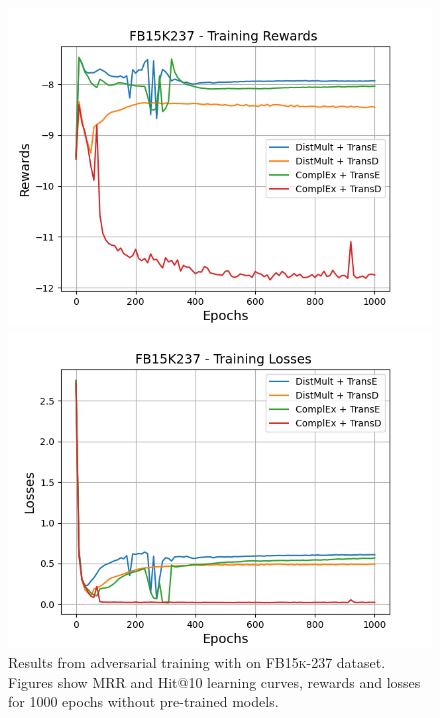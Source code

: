 \begin{figure}[H]
    \begin{minipage}{.5\textwidth}
      \centering
      \includegraphics[width=\linewidth]{figures/results/gan_train/not_pretrained/uncertainty/max/entropy/fb15k237/1k_epochs/uncertainty_fb15k237_rew.png}
    \end{minipage}%
     \begin{minipage}{.5\textwidth}
      \centering
      \includegraphics[width=\linewidth]{figures/results/gan_train/not_pretrained/uncertainty/max/entropy/fb15k237/1k_epochs/uncertainty_fb15k237_losses.png}
    \end{minipage}%
    \caption{Results from adversarial training with \usmax on \textsc{FB15k-237} dataset.
    Figures show MRR and Hit@10 learning curves, rewards and losses for 1000 epochs without pre-trained models.}
    \label{fig:gan_train_not_pretrained_usmax_fb15k237}
\end{figure}
